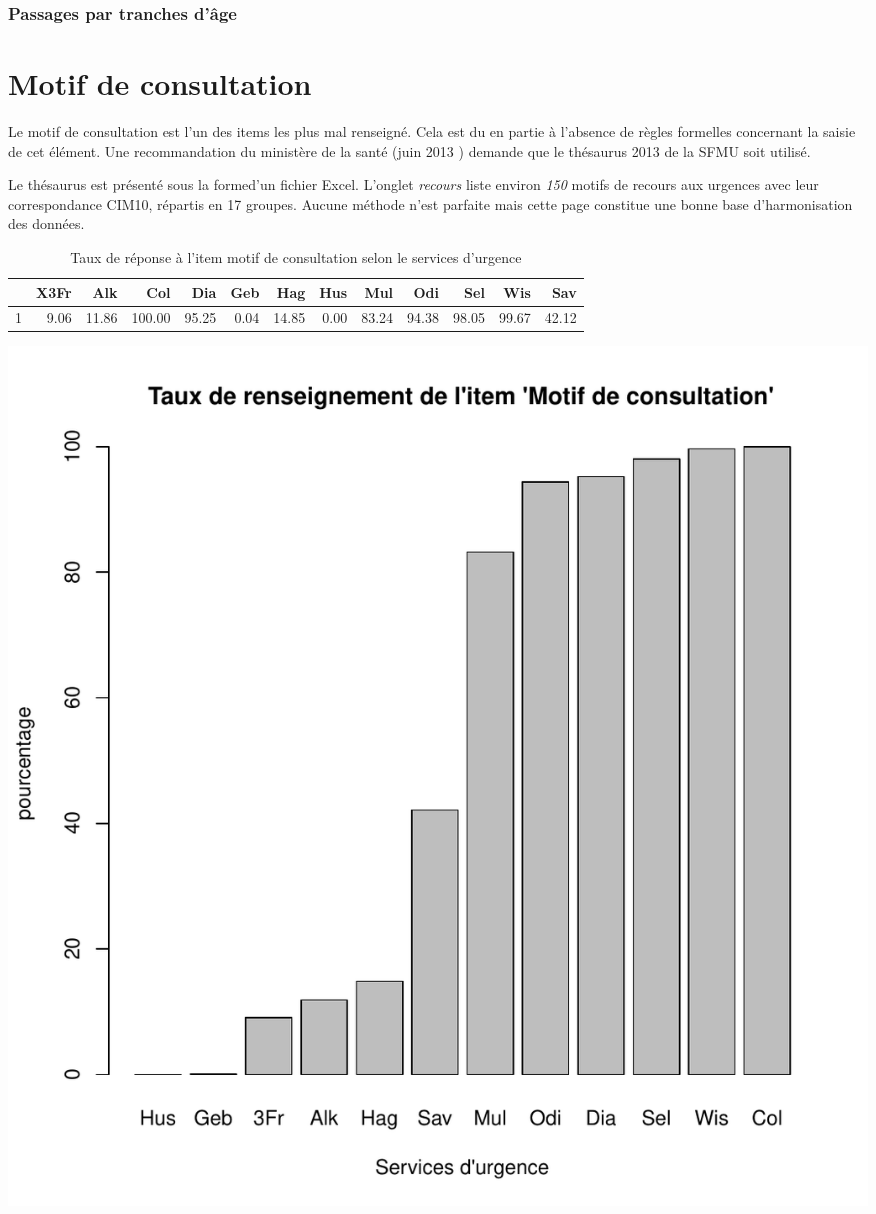 \documentclass[12pt,english,french,twoside]{report}\usepackage[]{graphicx}\usepackage[]{color}
\makeatletter
\def\maxwidth{ %
  \ifdim\Gin@nat@width>\linewidth
    \linewidth
  \else
    \Gin@nat@width
  \fi
}
\makeatother
\begin{document}
\subsection{Passages par tranches d'âge}

\chapter{Motif de consultation}



Le motif de consultation est l'un des items les plus mal renseigné. Cela est du en partie à l'absence de règles formelles concernant la saisie de cet élément. Une recommandation du ministère de la santé (juin 2013 \cite{12,13}) demande que le thésaurus 2013 de la SFMU \cite{9} soit utilisé.

Le thésaurus est présenté sous la formed'un fichier Excel. L'onglet \emph{recours} liste environ \emph{150} motifs de recours aux urgences avec leur correspondance CIM10, répartis en 17 groupes. Aucune méthode n'est parfaite mais cette page constitue une bonne base d'harmonisation des données.


\begin{table}[ht]
\centering
\begin{tabular}{rrrrrrrrrrrrr}
  \hline
 & X3Fr & Alk & Col & Dia & Geb & Hag & Hus & Mul & Odi & Sel & Wis & Sav \\ 
  \hline
1 & 9.06 & 11.86 & 100.00 & 95.25 & 0.04 & 14.85 & 0.00 & 83.24 & 94.38 & 98.05 & 99.67 & 42.12 \\ 
   \hline
\end{tabular}
\caption[motif de consultation]{Taux de réponse à l'item motif de consultation selon le services d'urgence} 
\label{lab:motif}
\end{table}

\includegraphics[width=\maxwidth]{figure/motifss1} 
\end{document}
